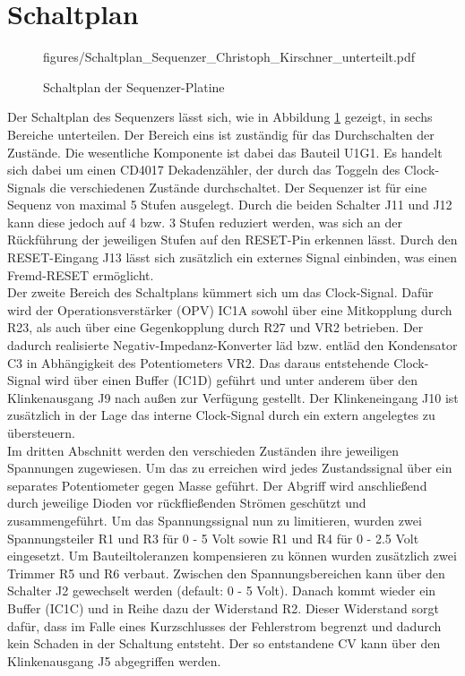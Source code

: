 \section{Schaltplan}
\newpage	%

\begin{figure}[h]
	\centering
	 {figures/Schaltplan_Sequenzer_Christoph_Kirschner_unterteilt.pdf}
	\caption{Schaltplan der Sequenzer-Platine}
	\label{fig:Schaltplan_des_Sequenzers}
\end{figure}

\newpage	%
Der Schaltplan des Sequenzers lässt sich, wie in Abbildung \ref{fig:Schaltplan_des_Sequenzers} gezeigt, in sechs Bereiche unterteilen. Der Bereich eins ist zuständig für das Durchschalten der Zustände.
Die wesentliche Komponente ist dabei das Bauteil U1G1. Es handelt sich dabei um einen CD4017 Dekadenzähler, der durch das Toggeln des Clock-Signals die verschiedenen Zustände durchschaltet. Der Sequenzer ist für eine Sequenz von maximal 5 Stufen ausgelegt. Durch die beiden Schalter J11 und J12 kann diese jedoch auf 4 bzw. 3 Stufen reduziert werden, was sich an der Rückführung der jeweiligen Stufen auf den RESET-Pin erkennen lässt. Durch den RESET-Eingang J13 lässt sich zusätzlich ein externes Signal einbinden, was einen Fremd-RESET ermöglicht.\\
Der zweite Bereich des Schaltplans kümmert sich um das Clock-Signal. Dafür wird der Operationsverstärker (OPV) IC1A sowohl über eine Mitkopplung durch R23, als auch über eine Gegenkopplung durch R27 und VR2 betrieben. Der dadurch realisierte Negativ-Impedanz-Konverter läd bzw. entläd den Kondensator C3 in Abhängigkeit des Potentiometers VR2. Das daraus entstehende Clock-Signal wird über einen Buffer (IC1D) geführt und unter anderem über den Klinkenausgang J9 nach außen zur Verfügung gestellt. Der Klinkeneingang J10 ist zusätzlich in der Lage das interne Clock-Signal durch ein extern angelegtes zu übersteuern.\\
Im dritten Abschnitt werden den verschieden Zuständen ihre jeweiligen Spannungen zugewiesen. Um das zu erreichen wird jedes Zustandssignal über ein separates Potentiometer gegen Masse geführt. Der Abgriff wird anschließend durch jeweilige Dioden vor rückfließenden Strömen geschützt und zusammengeführt. Um das Spannungssignal nun zu limitieren, wurden zwei Spannungsteiler R1 und R3 für 0 - 5 Volt sowie R1 und R4 für 0 - 2.5 Volt eingesetzt. Um Bauteiltoleranzen kompensieren zu können wurden zusätzlich zwei Trimmer R5 und R6 verbaut. Zwischen den Spannungsbereichen kann über den Schalter J2 gewechselt werden (default: 0 - 5 Volt). Danach kommt wieder ein Buffer (IC1C) und in Reihe dazu der Widerstand R2. Dieser Widerstand sorgt dafür, dass im Falle eines Kurzschlusses der Fehlerstrom begrenzt und dadurch kein Schaden in der Schaltung entsteht. Der so entstandene CV kann über den Klinkenausgang J5 abgegriffen werden.\\
